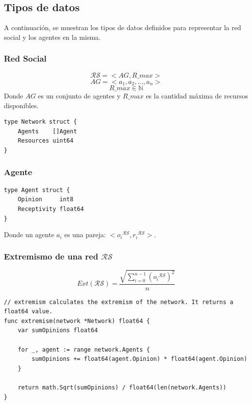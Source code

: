 \documentclass[letterpaper,10pt]{article}
\begin{document}
\subsection*{Tipos de datos}
A continuación, se muestran los tipos de datos definidos para representar la red social y los agentes en la misma.
\subsubsection*{Red Social}
\[
  \mathcal{R} \mathcal{S}  = < AG, R\_max >
\]
\[
  AG = < a_1, a_2, \ldots, a_n >
\]
\[
  R\_max \in \mathbb{N}
\]
Donde $AG$ es un conjunto de agentes y $R\_max$ es la cantidad máxima de recursos disponibles.

\begin{lstlisting}[caption={Definición de red social}, label={lst:r_s}]
type Network struct {
    Agents    []Agent
    Resources uint64
}
\end{lstlisting}
\subsubsection*{Agente}

\begin{lstlisting}[caption={Definición de agente}, label={lst:agente}]
type Agent struct {
    Opinion     int8
    Receptivity float64
}
\end{lstlisting}
Donde un agente $a_i$ es una pareja: $<{o_i}{^{\mathcal{R} \mathcal{S}}}, {r_i}{^{\mathcal{R} \mathcal{S}}}>$.
\newpage
\subsubsection*{Extremismo de una red $\mathcal{R}\mathcal{S}$}
\[
  Ext(\mathcal{R}\mathcal{S}) = \frac{\sqrt{\sum_{i=0}^{n-1}{({o_i}{^{\mathcal{R} \mathcal{S}}})^2}}}{n}
\]
\begin{lstlisting}[caption={Implementación del extremismo}, label={lst:ext}]
// extremism calculates the extremism of the network. It returns a float64 value.
func extremism(network *Network) float64 {
	var sumOpinions float64

	for _, agent := range network.Agents {
		sumOpinions += float64(agent.Opinion) * float64(agent.Opinion)
	}

	return math.Sqrt(sumOpinions) / float64(len(network.Agents))
}
\end{lstlisting}
\end{document}
